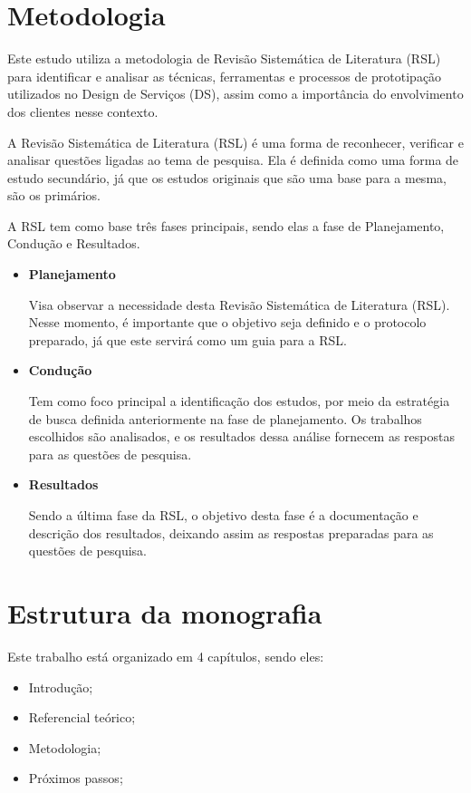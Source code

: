 \section{Metodologia}

Este estudo utiliza a metodologia de Revisão Sistemática de Literatura (RSL) para identificar e analisar as técnicas, ferramentas e processos de prototipação utilizados no Design de Serviços (DS), assim como a importância do envolvimento dos clientes nesse contexto. 

A Revisão Sistemática de Literatura (RSL) é uma forma de reconhecer, verificar e analisar questões ligadas ao tema de pesquisa. Ela é definida como uma forma de estudo secundário, já que os estudos originais que são uma base para a mesma, são os primários.

A RSL tem como base três fases principais, sendo elas a fase de Planejamento, Condução e Resultados.

\begin{itemize}
	\item \textbf{Planejamento}
	
	Visa observar a necessidade desta Revisão Sistemática de Literatura (RSL). Nesse momento, é importante que o objetivo seja definido e o protocolo preparado, já que este servirá como um guia para a RSL.
	
	\item \textbf{Condução}
	
	Tem como foco principal a identificação dos estudos, por meio da estratégia de busca definida anteriormente na fase de planejamento. Os trabalhos escolhidos são analisados, e os resultados dessa análise fornecem as respostas para as questões de pesquisa.
	
	\item \textbf{Resultados}
	
	Sendo a última fase da RSL, o objetivo desta fase é a documentação e descrição dos resultados, deixando assim as respostas preparadas para as questões de pesquisa.
\end{itemize}

\section{Estrutura da monografia}

Este trabalho está organizado em 4 capítulos, sendo eles:

\begin{itemize}
	\item Introdução;
	
	\item Referencial teórico;
	
	\item Metodologia;
	
	\item Próximos passos;
\end{itemize}
